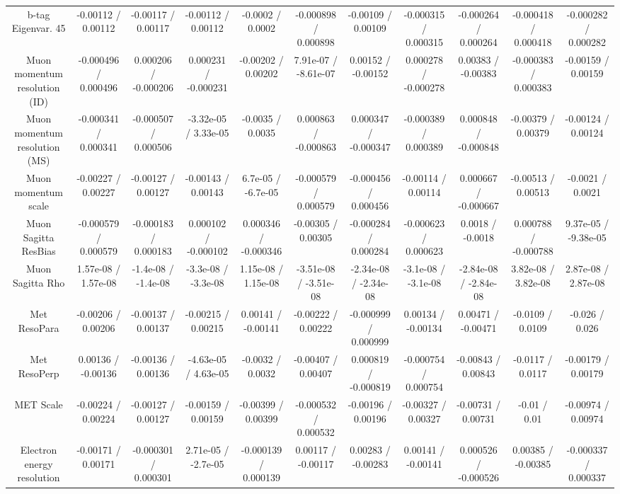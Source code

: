 \begin{table}[htbp]
\begin{center}
\begin{tabular}{|c|c|c|c|c|c|c|c|c|c|c|}
  b-tag Eigenvar. 45 & -0.00112 / 0.00112 & -0.00117 / 0.00117 & -0.00112 / 0.00112 & -0.0002 / 0.0002 & -0.000898 / 0.000898 & -0.00109 / 0.00109 & -0.000315 / 0.000315 & -0.000264 / 0.000264 & -0.000418 / 0.000418 & -0.000282 / 0.000282 \\ 
  Muon momentum resolution (ID) & -0.000496 / 0.000496 & 0.000206 / -0.000206 & 0.000231 / -0.000231 & -0.00202 / 0.00202 & 7.91e-07 / -8.61e-07 & 0.00152 / -0.00152 & 0.000278 / -0.000278 & 0.00383 / -0.00383 & -0.000383 / 0.000383 & -0.00159 / 0.00159 \\ 
  Muon momentum resolution (MS) & -0.000341 / 0.000341 & -0.000507 / 0.000506 & -3.32e-05 / 3.33e-05 & -0.0035 / 0.0035 & 0.000863 / -0.000863 & 0.000347 / -0.000347 & -0.000389 / 0.000389 & 0.000848 / -0.000848 & -0.00379 / 0.00379 & -0.00124 / 0.00124 \\ 
  Muon momentum scale & -0.00227 / 0.00227 & -0.00127 / 0.00127 & -0.00143 / 0.00143 & 6.7e-05 / -6.7e-05 & -0.000579 / 0.000579 & -0.000456 / 0.000456 & -0.00114 / 0.00114 & 0.000667 / -0.000667 & -0.00513 / 0.00513 & -0.0021 / 0.0021 \\ 
  Muon Sagitta ResBias & -0.000579 / 0.000579 & -0.000183 / 0.000183 & 0.000102 / -0.000102 & 0.000346 / -0.000346 & -0.00305 / 0.00305 & -0.000284 / 0.000284 & -0.000623 / 0.000623 & 0.0018 / -0.0018 & 0.000788 / -0.000788 & 9.37e-05 / -9.38e-05 \\ 
  Muon Sagitta Rho & 1.57e-08 / 1.57e-08 & -1.4e-08 / -1.4e-08 & -3.3e-08 / -3.3e-08 & 1.15e-08 / 1.15e-08 & -3.51e-08 / -3.51e-08 & -2.34e-08 / -2.34e-08 & -3.1e-08 / -3.1e-08 & -2.84e-08 / -2.84e-08 & 3.82e-08 / 3.82e-08 & 2.87e-08 / 2.87e-08 \\ 
  Met ResoPara & -0.00206 / 0.00206 & -0.00137 / 0.00137 & -0.00215 / 0.00215 & 0.00141 / -0.00141 & -0.00222 / 0.00222 & -0.000999 / 0.000999 & 0.00134 / -0.00134 & 0.00471 / -0.00471 & -0.0109 / 0.0109 & -0.026 / 0.026 \\ 
  Met ResoPerp & 0.00136 / -0.00136 & -0.00136 / 0.00136 & -4.63e-05 / 4.63e-05 & -0.0032 / 0.0032 & -0.00407 / 0.00407 & 0.000819 / -0.000819 & -0.000754 / 0.000754 & -0.00843 / 0.00843 & -0.0117 / 0.0117 & -0.00179 / 0.00179 \\ 
  MET Scale & -0.00224 / 0.00224 & -0.00127 / 0.00127 & -0.00159 / 0.00159 & -0.00399 / 0.00399 & -0.000532 / 0.000532 & -0.00196 / 0.00196 & -0.00327 / 0.00327 & -0.00731 / 0.00731 & -0.01 / 0.01 & -0.00974 / 0.00974 \\ 
  Electron energy resolution & -0.00171 / 0.00171 & -0.000301 / 0.000301 & 2.71e-05 / -2.7e-05 & -0.000139 / 0.000139 & 0.00117 / -0.00117 & 0.00283 / -0.00283 & 0.00141 / -0.00141 & 0.000526 / -0.000526 & 0.00385 / -0.00385 & -0.000337 / 0.000337 \\ 

\end{tabular}
\end{center}
\end{table}
